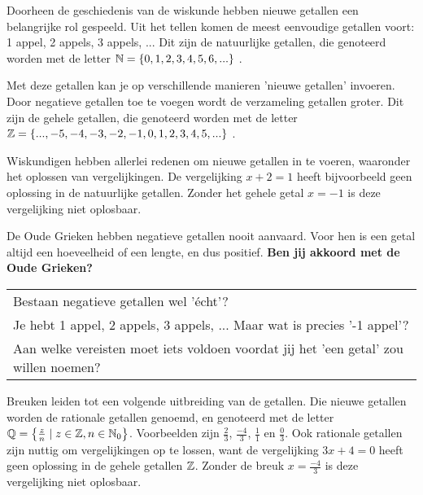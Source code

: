 \documentclass{ximera}
\begin{document}
    \author{Kwinten Obbels}

Doorheen de geschiedenis van de wiskunde hebben nieuwe getallen een belangrijke rol gespeeld.
Uit het tellen komen de meest eenvoudige getallen voort: 1 appel, 2 appels, 3 appels, ... 
Dit zijn de natuurlijke getallen, die genoteerd worden met de letter \( \mathbb{N} = \{0, 1, 2, 3, 4, 5, 6, ...\} \) . 

Met deze getallen kan je op verschillende manieren 'nieuwe getallen' invoeren. 
Door negatieve getallen toe te voegen wordt de verzameling getallen groter.  
Dit zijn de gehele getallen, die genoteerd worden met de letter  \( \mathbb{Z} = \{..., -5, -4, -3, -2, -1, 0, 1, 2, 3, 4, 5, ...\} \) . 

Wiskundigen hebben allerlei redenen om nieuwe getallen in te voeren, waaronder het oplossen van vergelijkingen. 
De vergelijking \(x + 2 = 1\) heeft bijvoorbeeld geen oplossing in de natuurlijke getallen.
Zonder het gehele getal \(x = -1\) is deze vergelijking niet oplosbaar. 


\begin{denkvraag*}{}
    De Oude Grieken hebben negatieve getallen nooit aanvaard. 
    Voor hen is een getal altijd een hoeveelheid of een lengte, en dus positief. 
    \textbf{Ben jij akkoord met de Oude Grieken?}
    \\
\begin{tabular}{@{\qquad}l}
    Bestaan negatieve getallen wel 'écht'? \\
    Je hebt 1 appel, 2 appels, 3 appels, ... Maar wat is precies '-1 appel'? \\
    Aan welke vereisten moet iets voldoen voordat jij het 'een getal' zou willen noemen? \\
\end{tabular}
\end{denkvraag*}


Breuken leiden tot een volgende uitbreiding van de getallen.
Die nieuwe getallen worden de rationale getallen genoemd, en genoteerd met de letter \( \mathbb{Q}  = \left\{ \frac{z}{n} \mid z \in \mathbb{Z}, n \in \mathbb{N}_0 \right\}\).
Voorbeelden zijn \(\frac{2}{3}\), \(\frac{-4}{3}\), \(\frac{1}{1}\) en \(\frac{0}{3}\). 
Ook rationale getallen zijn nuttig om vergelijkingen op te lossen, 
want de vergelijking \(3x + 4 = 0\) heeft geen oplossing in de gehele getallen \( \mathbb{Z} \).
Zonder de breuk \(x = \frac{-4}{3}\) is deze vergelijking niet oplosbaar.
\end{document}
